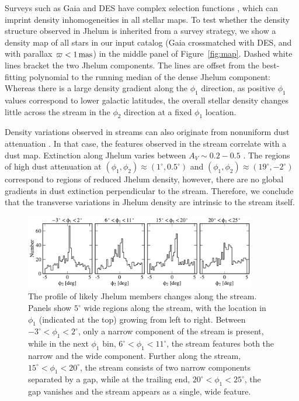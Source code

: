 \documentclass[twocolumn]{aastex62}
\begin{document}
Surveys such as Gaia and DES have complex selection functions \citep[e.g.,][]{bovy2017}, which can imprint density inhomogeneities in all stellar maps.
To test whether the density structure observed in Jhelum is inherited from a survey strategy, we show a density map of all stars in our input catalog (Gaia crossmatched with DES, and with parallax $\varpi<1\,\rm mas$) in the middle panel of Figure~\ref{fig:map}.
Dashed white lines bracket the two Jhelum components.
The lines are offset from the best-fitting polynomial to the running median of the dense Jhelum component:
\begin{equation}

\label{eq:track}
\end{equation}
Whereas there is a large density gradient along the $\phi_1$ direction, as positive $\phi_1$ values correspond to lower galactic latitudes, the overall stellar density changes little across the stream in the $\phi_2$ direction at a fixed $\phi_1$ location.

Density variations observed in streams can also originate from nonuniform dust attenuation \citep[e.g.,][]{ibata2016}.
In that case, the features observed in the stream correlate with a dust map.
Extinction along Jhelum varies between $A_V\sim0.2-0.5$ \citep[Figure~\ref{fig:map}, bottom;][]{sfd}.
The regions of high dust attenuation at $(\phi_1,\phi_2)\approx(1^\circ,0.5^\circ)$ and $(\phi_1,\phi_2)\approx(19^\circ,-2^\circ)$ correspond to regions of reduced Jhelum density, however, there are no global gradients in dust extinction perpendicular to the stream.
Therefore, we conclude that the transverse variations in Jhelum density are intrinsic to the stream itself.

\begin{figure}
\begin{center}
\includegraphics[width=0.9\textwidth]{phi2_histograms.pdf}
\end{center}
\caption{
The profile of likely Jhelum members changes along the stream.
Panels show $5^\circ$ wide regions along the stream, with the location in $\phi_1$ (indicated at the top) growing from left to right.
Between $-3^\circ<\phi_1<2^\circ$, only a narrow component of the stream is present, while in the next $\phi_1$ bin, $6^\circ<\phi_1<11^\circ$, the stream features both the narrow and the wide component.
Further along the stream, $15^\circ<\phi_1<20^\circ$, the stream consists of two narrow components separated by a gap, while at the trailing end, $20^\circ<\phi_1<25^\circ$, the gap vanishes and the stream appears as a single, wide feature.
}
\label{fig:histo}
\end{figure}
\end{document}
